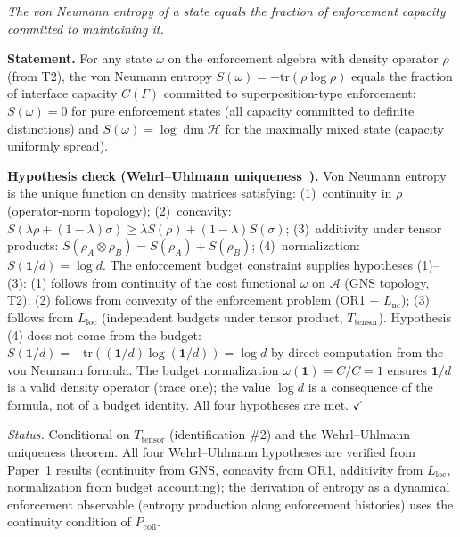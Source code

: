 \documentclass[11pt]{article}
\theoremstyle{remark}
\begin{document}
\begin{tcolorbox}[apfbox, title={$T_{\mathrm{entropy}}$: Von Neumann Entropy as Committed Capacity}]
\textit{The von Neumann entropy of a state equals the fraction of enforcement capacity committed to maintaining it.}

\smallskip\noindent\textbf{Statement.}  For any state $\omega$ on the enforcement algebra with density operator $\rho$ (from T2), the von Neumann entropy $S(\omega) = -\mathrm{tr}(\rho\log\rho)$ equals the fraction of interface capacity $C(\Gamma)$ committed to superposition-type enforcement: $S(\omega) = 0$ for pure enforcement states (all capacity committed to definite distinctions) and $S(\omega) = \log \dim\mathcal{H}$ for the maximally mixed state (capacity uniformly spread).

\smallskip\noindent\textbf{Hypothesis check (Wehrl--Uhlmann uniqueness~\cite{Wehrl1978}).}  Von Neumann entropy is the unique function on density matrices satisfying: (1)~continuity in $\rho$ (operator-norm topology); (2)~concavity: $S(\lambda\rho + (1{-}\lambda)\sigma) \ge \lambda S(\rho) + (1{-}\lambda)S(\sigma)$; (3)~additivity under tensor products: $S(\rho_A \otimes \rho_B) = S(\rho_A) + S(\rho_B)$; (4)~normalization: $S(\mathbf{1}/d) = \log d$.  The enforcement budget constraint supplies hypotheses (1)--(3): (1) follows from continuity of the cost functional $\omega$ on $\mathcal{A}$ (GNS topology, T2); (2) follows from convexity of the enforcement problem (OR1 + $L_{\mathrm{nc}}$); (3) follows from $L_{\mathrm{loc}}$ (independent budgets under tensor product, $T_{\mathrm{tensor}}$).  Hypothesis (4) does not come from the budget: $S(\mathbf{1}/d) = -\mathrm{tr}((\mathbf{1}/d)\log(\mathbf{1}/d)) = \log d$ by direct computation from the von Neumann formula.  The budget normalization $\omega(\mathbf{1}) = C/C = 1$ ensures $\mathbf{1}/d$ is a valid density operator (trace one); the value $\log d$ is a consequence of the formula, not of a budget identity.  All four hypotheses are met.  $\checkmark$

\smallskip\noindent\textit{Status.}  Conditional on $T_{\mathrm{tensor}}$ (identification \#2) and the Wehrl--Uhlmann uniqueness theorem.  All four Wehrl--Uhlmann hypotheses are verified from Paper~1 results (continuity from GNS, concavity from OR1, additivity from $L_{\mathrm{loc}}$, normalization from budget accounting); the derivation of entropy as a dynamical enforcement observable (entropy production along enforcement histories) uses the continuity condition of $P_{\mathrm{coll}}$.
\end{tcolorbox}
\end{document}
